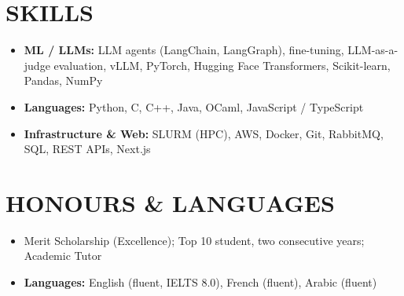 \documentclass[10pt, a4paper]{article}
\begin{document}
\section*{SKILLS}
\begin{itemize}
    \item \textbf{ML / LLMs:} LLM agents (LangChain, LangGraph), fine-tuning, LLM-as-a-judge evaluation, vLLM, PyTorch, Hugging Face Transformers, Scikit-learn, Pandas, NumPy
    \item \textbf{Languages:} Python, C, C++, Java, OCaml, JavaScript / TypeScript
    \item \textbf{Infrastructure \& Web:} SLURM (HPC), AWS, Docker, Git, RabbitMQ, SQL, REST APIs, Next.js
\end{itemize}

\section*{HONOURS \& LANGUAGES}
\begin{itemize}
    \item Merit Scholarship (Excellence); Top 10 student, two consecutive years; Academic Tutor
    \item \textbf{Languages:} English (fluent, IELTS 8.0), French (fluent), Arabic (fluent)
\end{itemize}
\end{document}
